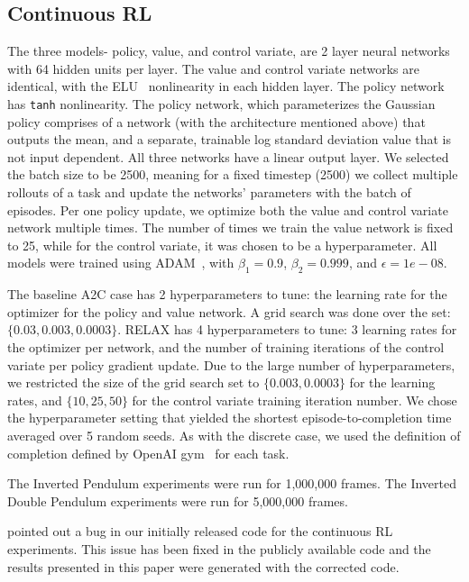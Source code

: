 \documentclass{article}
\newcommand{\RELAX}{{\textnormal{RELAX}}}
\begin{document}
\subsection{Continuous RL}
The three models- policy, value, and control variate, are 2 layer neural networks with 64 hidden units per layer.
The value and control variate networks are identical, with the ELU~\citep{Clevert2016ELUs} nonlinearity in each hidden layer.
The policy network has \texttt{tanh} nonlinearity.
The policy network, which parameterizes the Gaussian policy comprises of a network (with the architecture mentioned above) that outputs the mean, and a separate, trainable log standard deviation value that is not input dependent.
All three networks have a linear output layer.
We selected the batch size to be 2500, meaning for a fixed timestep (2500) we collect multiple rollouts of a task and update the networks' parameters with the batch of episodes.
Per one policy update, we optimize both the value and control variate network multiple times.
The number of times we train  the value network is fixed to 25, while for the control variate, it was chosen to be a hyperparameter. 
All models were trained using ADAM~\citep{kingma2015adam}, with $\beta_1=0.9$, $\beta_2=0.999$, and $\epsilon=1e-08$. 

The baseline A2C case has 2 hyperparameters to tune: the learning rate for the optimizer for the policy and value network.
A grid search was done over the set: $\{0.03, 0.003, 0.0003\}$.
\RELAX{} has 4 hyperparameters to tune: 3 learning rates for the optimizer per network, and the number of training iterations of the control variate per policy gradient update.
Due to the large number of hyperparameters, we restricted the size of the grid search set to $\{0.003, 0.0003\}$ for the learning rates, and $\{10, 25, 50\}$ for the control variate training iteration number.
We chose the hyperparameter setting that yielded the shortest episode-to-completion time averaged over 5 random seeds.
As with the discrete case, we used the definition of completion defined by OpenAI gym~\citep{1606.01540} for each task. 

The Inverted Pendulum experiments were run for 1,000,000 frames.
The Inverted Double Pendulum experiments were run for 5,000,000 frames.

\citet{tucker2018mirage} pointed out a bug in our initially released code for the continuous RL experiments. This issue has been fixed in the publicly available code and the results presented in this paper were generated with the corrected code. 
\end{document}
